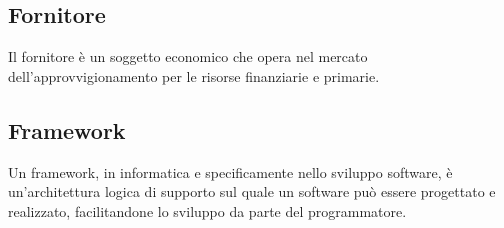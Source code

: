 
\subsection*{Fornitore}
Il fornitore è un soggetto economico che opera nel mercato dell'approvvigionamento per le risorse finanziarie e primarie.

\subsection*{Framework}
Un framework, in informatica e specificamente nello sviluppo software, è un'architettura logica di supporto sul quale un software può essere progettato e realizzato, facilitandone lo sviluppo da parte del programmatore.

